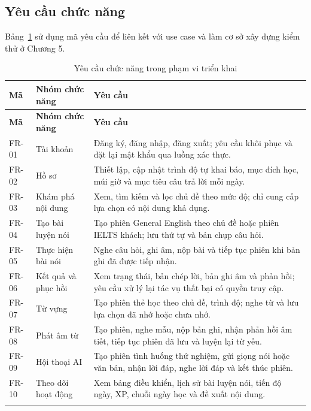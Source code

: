 \documentclass[12pt,a4paper,oneside]{report}
\begin{document}
\subsection{Yêu cầu chức năng}

Bảng~\ref{tab:yeu-cau-chuc-nang} sử dụng mã yêu cầu để liên kết với use case và làm cơ sở xây dựng kiểm thử ở Chương 5.

\begin{longtable}{@{}p{1.5cm}p{3.3cm}p{9.5cm}@{}}
    \toprule
    \textbf{Mã} & \textbf{Nhóm chức năng} & \textbf{Yêu cầu} \\
    \midrule
    \endfirsthead
    \toprule
    \textbf{Mã} & \textbf{Nhóm chức năng} & \textbf{Yêu cầu} \\
    \midrule
    \endhead
    FR-01 & Tài khoản & Đăng ký, đăng nhập, đăng xuất; yêu cầu khôi phục và đặt lại mật khẩu qua luồng xác thực. \\
    FR-02 & Hồ sơ & Thiết lập, cập nhật trình độ tự khai báo, mục đích học, múi giờ và mục tiêu câu trả lời mỗi ngày. \\
    FR-03 & Khám phá nội dung & Xem, tìm kiếm và lọc chủ đề theo mức độ; chỉ cung cấp lựa chọn có nội dung khả dụng. \\
    FR-04 & Tạo bài luyện nói & Tạo phiên General English theo chủ đề hoặc phiên IELTS khách; lưu thứ tự và bản chụp câu hỏi. \\
    FR-05 & Thực hiện bài nói & Nghe câu hỏi, ghi âm, nộp bài và tiếp tục phiên khi bản ghi đã được tiếp nhận. \\
    FR-06 & Kết quả và phục hồi & Xem trạng thái, bản chép lời, bản ghi âm và phản hồi; yêu cầu xử lý lại tác vụ thất bại có quyền truy cập. \\
    FR-07 & Từ vựng & Tạo phiên thẻ học theo chủ đề, trình độ; nghe từ và lưu lựa chọn đã nhớ hoặc chưa nhớ. \\
    FR-08 & Phát âm từ & Tạo phiên, nghe mẫu, nộp bản ghi, nhận phản hồi âm tiết, tiếp tục phiên đã lưu và luyện lại từ yếu. \\
    FR-09 & Hội thoại AI & Tạo phiên tình huống thử nghiệm, gửi giọng nói hoặc văn bản, nhận lời đáp, nghe lời đáp và kết thúc phiên. \\
    FR-10 & Theo dõi hoạt động & Xem bảng điều khiển, lịch sử bài luyện nói, tiến độ ngày, XP, chuỗi ngày học và đề xuất nội dung. \\
    \bottomrule
    \caption{Yêu cầu chức năng trong phạm vi triển khai}\label{tab:yeu-cau-chuc-nang}\\
\end{longtable}
\end{document}
